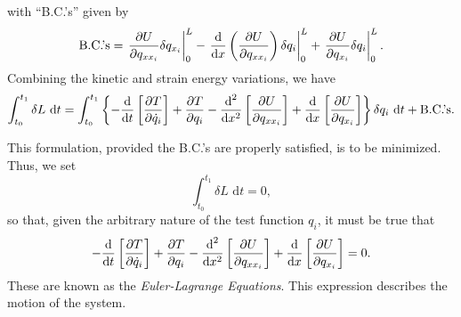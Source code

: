with ``B.C.'s'' given by
\begin{equation}
\text{B.C.'s} = \left.\frac{\partial U}{\partial q_{xx_i}}\delta q_{x_i}\right|_0^L-\left.\frac{\text d}{\text dx}\left(\frac{\partial U}{\partial q_{xx_i}}\right)\delta q_i\right|_0^L + \left.\frac{\partial U}{\partial q_{x_i}}\delta q_i\right|_0^L.
\end{equation} 
Combining the kinetic and strain energy variations, we have
\begin{equation}
\int_{t_0}^{t_1}\delta L\text{ d}t = \int_{t_0}^{t_1}\left\lbrace-\frac{\text d}{\text dt}\left[\frac{\partial T}{\partial \dot q_i}\right]+\frac{\partial T}{\partial q_i} - \frac{\text d^2}{\text dx^2}\left[\frac{\partial U}{\partial q_{xx_i}}\right]+\frac{\text d}{\text dx}\left[\frac{\partial  U}{\partial q_{x_i}}\right]\right\rbrace\delta q_i\text{ d}t+\text{B.C.'s}.
\end{equation}

This formulation, provided the B.C.'s are properly satisfied, is to be minimized. Thus, we set
\begin{equation}
\int_{t_0}^{t_1}\delta L\text{ d}t = 0,
\end{equation}
so that, given the arbitrary nature of the test function $q_i$, it must be true that
\begin{equation}
-\frac{\text d}{\text dt}\left[\frac{\partial T}{\partial \dot q_i}\right]+\frac{\partial T}{\partial q_i} - \frac{\text d^2}{\text dx^2}\left[\frac{\partial U}{\partial q_{xx_i}}\right]+\frac{\text d}{\text dx}\left[\frac{\partial  U}{\partial q_{x_i}}\right] = 0.
\label{eq:euler.lagrange}
\end{equation}
These are known as the \emph{Euler-Lagrange Equations}. This expression describes the motion of the system.

